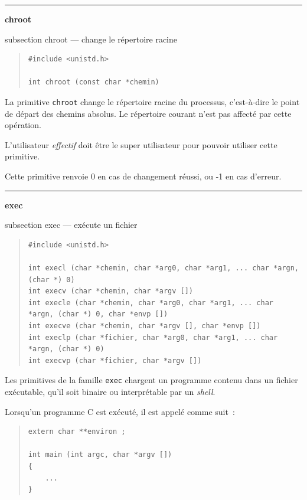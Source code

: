 \documentclass [twoside] {report}
\newcommand {\primitive} [1]
    {
	\phantomsection
	{\large \textbf {#1}}
	\addcontentsline {toc} {subsection} {#1}
    }
\newcommand {\separation}
    {
	\vspace {5mm}
	\nopagebreak
	\hrule
    }
\begin{document}
\separation
\primitive {chroot} --- change le répertoire racine

\begin {quote}
\begin {verbatim}
#include <unistd.h>

int chroot (const char *chemin)
\end{verbatim}
\end {quote}

La primitive \texttt {chroot} change le répertoire
racine du processus, c'est-à-dire le point de
départ des chemins absolus. Le répertoire courant
n'est pas affecté par cette opération.

L'utilisateur \emph {effectif} doit être le super
utilisateur pour pouvoir utiliser cette primitive.

Cette primitive renvoie 0 en cas de changement
réussi, ou -1 en cas d'erreur.




\separation
\primitive {exec} --- exécute un fichier

\begin {quote}
\begin {verbatim}
#include <unistd.h>

int execl (char *chemin, char *arg0, char *arg1, ... char *argn, (char *) 0)
int execv (char *chemin, char *argv [])
int execle (char *chemin, char *arg0, char *arg1, ... char *argn, (char *) 0, char *envp [])
int execve (char *chemin, char *argv [], char *envp [])
int execlp (char *fichier, char *arg0, char *arg1, ... char *argn, (char *) 0)
int execvp (char *fichier, char *argv [])
\end{verbatim}
\end {quote}

Les primitives de la famille \texttt {exec} chargent un
programme contenu dans un fichier exécutable,
qu'il soit binaire ou interprétable par un
\emph {shell}.

Lorsqu'un programme C est exécuté, il est appelé
comme suit~:

\begin {quote}
\begin {verbatim}
extern char **environ ;

int main (int argc, char *argv [])
{
    ...
}
\end{verbatim}
\end {quote}
\end{document}
